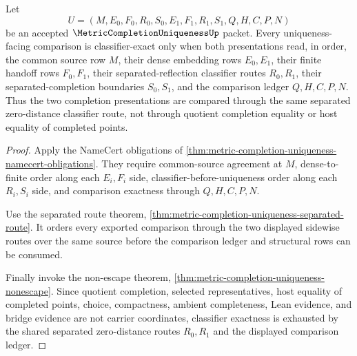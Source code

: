 \begin{theorem}
\label{thm:metric-completion-uniqueness-classifier}
Let
$$
U=(M,E_0,F_0,R_0,S_0,E_1,F_1,R_1,S_1,Q,H,C,P,N)
$$
be an accepted $\MetricCompletionUniquenessUp$ packet. Every uniqueness-facing comparison is classifier-exact only when both presentations read, in order, the common source row $M$, their dense embedding rows $E_0,E_1$, their finite handoff rows $F_0,F_1$, their separated-reflection classifier routes $R_0,R_1$, their separated-completion boundaries $S_0,S_1$, and the comparison ledger $Q,H,C,P,N$. Thus the two completion presentations are compared through the same separated zero-distance classifier route, not through quotient completion equality or host equality of completed points.
\end{theorem}
\begin{proof}
Apply the NameCert obligations of \autoref{thm:metric-completion-uniqueness-namecert-obligations}. They require common-source agreement at $M$, dense-to-finite order along each $E_i,F_i$ side, classifier-before-uniqueness order along each $R_i,S_i$ side, and comparison exactness through $Q,H,C,P,N$.

Use the separated route theorem, \autoref{thm:metric-completion-uniqueness-separated-route}. It orders every exported comparison through the two displayed sidewise routes over the same source before the comparison ledger and structural rows can be consumed.

Finally invoke the non-escape theorem, \autoref{thm:metric-completion-uniqueness-nonescape}. Since quotient completion, selected representatives, host equality of completed points, choice, compactness, ambient completeness, Lean evidence, and bridge evidence are not carrier coordinates, classifier exactness is exhausted by the shared separated zero-distance routes $R_0,R_1$ and the displayed comparison ledger.
\end{proof}

